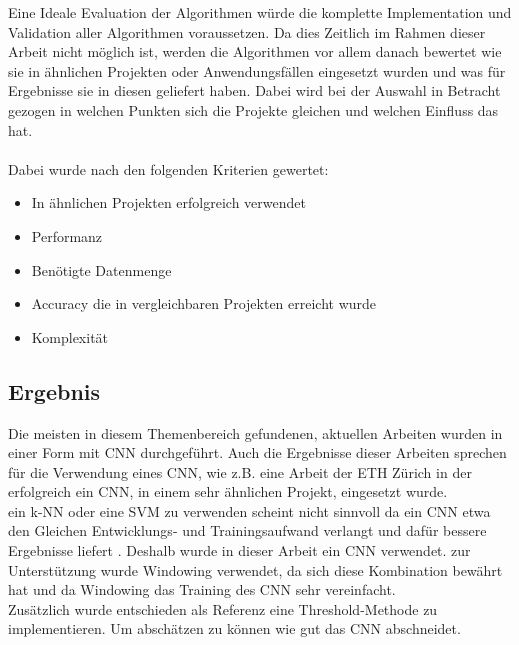 Eine Ideale Evaluation der Algorithmen würde die komplette Implementation und Validation aller Algorithmen voraussetzen. Da dies Zeitlich im Rahmen dieser Arbeit nicht möglich ist, werden die Algorithmen vor allem danach bewertet wie sie in ähnlichen Projekten oder Anwendungsfällen eingesetzt wurden und was für Ergebnisse sie in diesen geliefert haben. Dabei wird bei der Auswahl in Betracht gezogen in welchen Punkten sich die Projekte gleichen und welchen Einfluss das hat.\\
\\
Dabei wurde nach den folgenden Kriterien gewertet:
\begin{itemize}
	\item In ähnlichen Projekten erfolgreich verwendet
	\item Performanz
	\item Benötigte Datenmenge
	\item Accuracy die in vergleichbaren Projekten erreicht wurde
	\item Komplexität
\end{itemize}

\subsection{Ergebnis}

Die meisten in diesem Themenbereich gefundenen, aktuellen Arbeiten wurden in einer Form mit \gls{CNN} durchgeführt. Auch die Ergebnisse dieser Arbeiten sprechen für die Verwendung eines \gls{CNN}, wie z.B. eine Arbeit der ETH Zürich \parencite{gomez2018thermal} in der erfolgreich ein \gls{CNN}, in einem sehr ähnlichen Projekt, eingesetzt wurde. \\
ein \gls{k-NN} oder eine \gls{SVM} zu verwenden scheint nicht sinnvoll da ein \gls{CNN} etwa den Gleichen Entwicklungs- und Trainingsaufwand verlangt und dafür bessere Ergebnisse liefert \parencite{comparison_algorithms}.
Deshalb wurde in dieser Arbeit ein \gls{CNN} verwendet. zur Unterstützung wurde Windowing verwendet, da sich diese Kombination bewährt hat \parencite{gomez2018thermal} und da Windowing das Training des CNN sehr vereinfacht.\\
Zusätzlich wurde entschieden als Referenz eine Threshold-Methode zu implementieren. Um abschätzen zu können wie gut das \gls{CNN} abschneidet.





